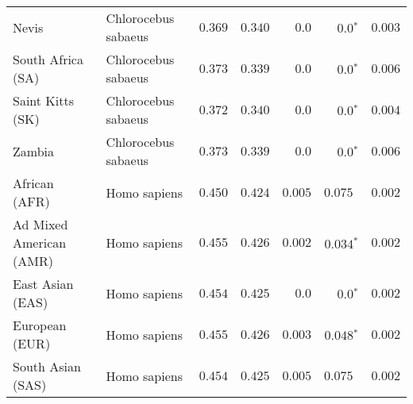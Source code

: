 \begin{center}
\begin{adjustbox}{width = 1\textwidth}
\begin{tabular}{|l|l|r|r|r|r|r|}
            Nevis               & Chlorocebus sabaeus & $ 0.369$ & $ 0.340$ & $0.0$    & $\bm{0.0{^*}}$    & $ 0.003$ \\
            South Africa (SA)                         & Chlorocebus sabaeus & $ 0.373$ & $ 0.339$ & $0.0$    & $\bm{0.0{^*}}$    & $ 0.006$ \\
            Saint Kitts (SK)                  & Chlorocebus sabaeus        & $ 0.372$ & $ 0.340$ & $0.0$ & $\bm{0.0{^*}}$        & $ 0.004$ \\
            Zambia        & Chlorocebus sabaeus        & $ 0.373$ & $ 0.339$ & $0.0$ & $\bm{0.0{^*}}$ & $ 0.006$ \\
            African (AFR)               & Homo sapiens        & $ 0.450$ & $ 0.424$ & $ 0.005$    & $ 0.075~~$    & $ 0.002$ \\
            Ad Mixed American (AMR)                 & Homo sapiens        & $ 0.455$ & $ 0.426$ & $ 0.002$ & $\bm{ 0.034{^*}}$ & $ 0.002$ \\
            East Asian (EAS)              & Homo sapiens        & $ 0.454$ & $ 0.425$ & $0.0$ & $\bm{0.0{^*}}$        & $ 0.002$ \\
            European (EUR)              & Homo sapiens        & $ 0.455$ & $ 0.426$ & $ 0.003$ & $\bm{ 0.048{^*}}$        & $ 0.002$ \\
            South Asian (SAS)              & Homo sapiens        & $ 0.454$ & $ 0.425$ & $ 0.005$ & $ 0.075~~$        & $ 0.002$ \\
            \bottomrule
        \end{tabular}
    \end{adjustbox}
    \newpage
\end{center}

